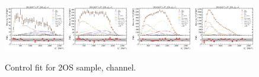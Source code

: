 \begin{figure}[!htb]
    \includegraphics[width=0.24\textwidth]{./figs-fit-fit-results/ctrl-fit/lines_q2_slices/fit_result-lines_q2_idx1-D0-2os-el.pdf}
    \includegraphics[width=0.24\textwidth]{./figs-fit-fit-results/ctrl-fit/lines_q2_slices/fit_result-lines_q2_idx2-D0-2os-el.pdf}
    \includegraphics[width=0.24\textwidth]{./figs-fit-fit-results/ctrl-fit/lines_q2_slices/fit_result-lines_q2_idx3-D0-2os-el.pdf}
    \includegraphics[width=0.24\textwidth]{./figs-fit-fit-results/ctrl-fit/lines_q2_slices/fit_result-lines_q2_idx4-D0-2os-el.pdf}

    \caption{Control fit for 2OS sample, \Dz channel.}
    \label{fig:ctrl-2os-d0}
\end{figure}

